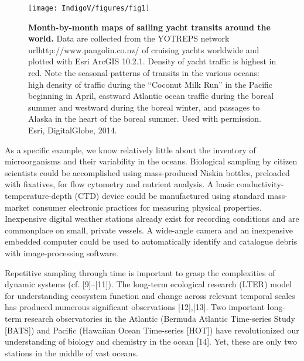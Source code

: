 \begin{figure}
\centering
\texttt{[image: IndigoV/figures/fig1]}
\caption{\textbf{Month-by-month maps of sailing yacht transits around the world.} Data are collected from the YOTREPS network url{http://www.pangolin.co.nz/} of cruising yachts worldwide and plotted with Esri ArcGIS 10.2.1. Density of yacht traffic is highest in red. Note the seasonal patterns of transits in the various oceans: high density of traffic during the “Coconut Milk Run” in the Pacific beginning in April, eastward Atlantic ocean traffic during the boreal summer and westward during the boreal winter, and passages to Alaska in the heart of the boreal summer. Used with permission. Esri, DigitalGlobe, 2014.}
\label{IV_fig1}
\end{figure}

As a specific example, we know relatively little about the inventory of microorganisms and their variability in the oceans. Biological sampling by citizen scientists could be accomplished using mass-produced Niskin bottles, preloaded with fixatives, for flow cytometry and nutrient analysis. A basic conductivity-temperature-depth (CTD) device could be manufactured using standard mass-market consumer electronic practices for measuring physical properties. Inexpensive digital weather stations already exist for recording conditions and are commonplace on small, private vessels. A wide-angle camera and an inexpensive embedded computer could be used to automatically identify and catalogue debris with image-processing software.

Repetitive sampling through time is important to grasp the complexities of dynamic systems (cf. [9]–[11]). The long-term ecological research (LTER) model for understanding ecosystem function and change across relevant temporal scales has produced numerous significant observations [12],[13]. Two important long-term research observatories in the Atlantic (Bermuda Atlantic Time-series Study [BATS]) and Pacific (Hawaiian Ocean Time-series [HOT]) have revolutionized our understanding of biology and chemistry in the ocean [14]. Yet, these are only two stations in the middle of vast oceans.

